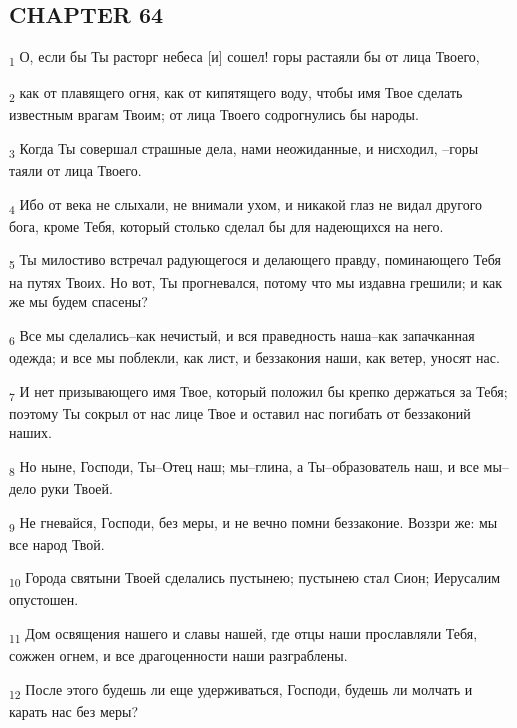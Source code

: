 \subsection{CHAPTER 64}
\begin{tcolorbox}
\textsubscript{1} О, если бы Ты расторг небеса [и] сошел! горы растаяли бы от лица Твоего,
\end{tcolorbox}
\begin{tcolorbox}
\textsubscript{2} как от плавящего огня, как от кипятящего воду, чтобы имя Твое сделать известным врагам Твоим; от лица Твоего содрогнулись бы народы.
\end{tcolorbox}
\begin{tcolorbox}
\textsubscript{3} Когда Ты совершал страшные дела, нами неожиданные, и нисходил, --горы таяли от лица Твоего.
\end{tcolorbox}
\begin{tcolorbox}
\textsubscript{4} Ибо от века не слыхали, не внимали ухом, и никакой глаз не видал другого бога, кроме Тебя, который столько сделал бы для надеющихся на него.
\end{tcolorbox}
\begin{tcolorbox}
\textsubscript{5} Ты милостиво встречал радующегося и делающего правду, поминающего Тебя на путях Твоих. Но вот, Ты прогневался, потому что мы издавна грешили; и как же мы будем спасены?
\end{tcolorbox}
\begin{tcolorbox}
\textsubscript{6} Все мы сделались--как нечистый, и вся праведность наша--как запачканная одежда; и все мы поблекли, как лист, и беззакония наши, как ветер, уносят нас.
\end{tcolorbox}
\begin{tcolorbox}
\textsubscript{7} И нет призывающего имя Твое, который положил бы крепко держаться за Тебя; поэтому Ты сокрыл от нас лице Твое и оставил нас погибать от беззаконий наших.
\end{tcolorbox}
\begin{tcolorbox}
\textsubscript{8} Но ныне, Господи, Ты--Отец наш; мы--глина, а Ты--образователь наш, и все мы--дело руки Твоей.
\end{tcolorbox}
\begin{tcolorbox}
\textsubscript{9} Не гневайся, Господи, без меры, и не вечно помни беззаконие. Воззри же: мы все народ Твой.
\end{tcolorbox}
\begin{tcolorbox}
\textsubscript{10} Города святыни Твоей сделались пустынею; пустынею стал Сион; Иерусалим опустошен.
\end{tcolorbox}
\begin{tcolorbox}
\textsubscript{11} Дом освящения нашего и славы нашей, где отцы наши прославляли Тебя, сожжен огнем, и все драгоценности наши разграблены.
\end{tcolorbox}
\begin{tcolorbox}
\textsubscript{12} После этого будешь ли еще удерживаться, Господи, будешь ли молчать и карать нас без меры?
\end{tcolorbox}
